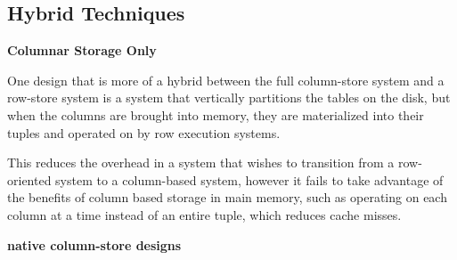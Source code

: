 \subsection*{Hybrid Techniques}



	\textbf{Columnar Storage Only}


	One design that is more of a hybrid between the full column-store system and a row-store system is a system that vertically partitions the tables on the disk, but when the columns are brought into memory, they are materialized into their tuples and operated on by row execution systems\cite{now}.


	This reduces the overhead in a system that wishes to transition from a row-oriented system to a column-based system, however it fails to take advantage of the benefits of column based storage in main memory, such as operating on each column at a time instead of an entire tuple, which reduces cache misses.



	\textbf{native column-store designs} %
